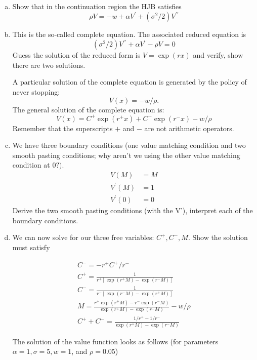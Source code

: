\documentclass[11pt]{extarticle}
\theoremstyle{plain}
\theoremstyle{definition}
\begin{document}
\begin{enumerate}[(a)]
\item Show that in the continuation region the HJB satisfies $$\rho V = -w+\alpha V^{\prime}+\left(\sigma^2 / 2\right) V^{\prime \prime}$$


\item This is the so-called complete equation. The associated reduced equation is
$$
\left(\sigma^2 / 2\right) V^{\prime \prime}+\alpha V^{\prime}-\rho V=0
$$
Guess the solution of the reduced form is $V=\exp (r x)$ and verify, show there are two solutions.

A particular solution of the complete equation is generated by the policy of never stopping:
$$
V(x)=-w / \rho .
$$
The general solution of the complete equation is:
$$
V(x)=C^{+} \exp \left(r^{+} x\right)+C^{-} \exp \left(r^{-} x\right)-w / \rho
$$
Remember that the superscripts $+$ and $-$ are not arithmetic operators.

\item We have three boundary conditions (one value matching condition and two smooth pasting conditions; why aren't we using the other value matching condition at $0 ?)$.
$$
\begin{aligned}
V(M) &=M \\
V^{\prime}(M) &=1 \\
V^{\prime}(0) &=0
\end{aligned}
$$
Derive the two smooth pasting conditions (with the V'), interpret each of the boundary conditions.

\item  We can now solve for our three free variables:  $C^{+}, C^{-}, M $. Show the solution must satisfy 

$$
\begin{gathered}
C^{-}=-r^{+} C^{+} / r^{-} \\
C^{+}=\frac{1}{r^{+}\left[\exp \left(r^{+} M\right)-\exp \left(r^{-} M\right)\right]} \\
C^{-}=\frac{1}{r^{-}\left[\exp \left(r^{-} M\right)-\exp \left(r^{+} M\right)\right]} \\
M=\frac{r^{+} \exp \left(r^{+} M\right)-r^{-} \exp \left(r^{-} M\right)}{\exp \left(r^{+} M\right)-\exp \left(r^{-} M\right)}-w / \rho \\
C^{+}+C^{-}=\frac{1 / r^{+}-1 / r^{-}}{\exp \left(r^{+} M\right)-\exp \left(r^{-} M\right)}
\end{gathered}
$$

The solution of the value function looks as follows (for parameters $\alpha=1, \sigma=5, w=1$, and $\rho=0.05$)


\end{enumerate}
\end{document}
